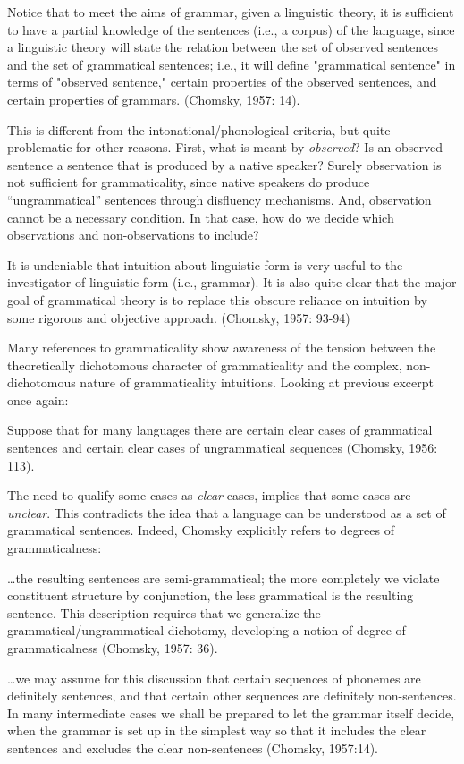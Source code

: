 Notice that to meet the aims of grammar, given a linguistic theory, it is sufficient to have a partial knowledge of the sentences (i.e., a corpus) of the language, since a linguistic theory will state the relation between the set of observed sentences and the set of grammatical sentences; i.e., it will define "grammatical sentence" in terms of "observed sentence," certain properties of the observed sentences, and certain properties of grammars. (Chomsky, 1957: 14).

  This is different from the intonational/phonological criteria, but quite problematic for other reasons. First, what is meant by \textit{observed}? Is an observed sentence a sentence that is produced by a native speaker? Surely observation is not sufficient for grammaticality, since native speakers do produce “ungrammatical” sentences through disfluency mechanisms. And, observation cannot be a necessary condition. In that case, how do we decide which observations and non-observations to include?

It is undeniable that intuition about linguistic form is very useful to the investigator of linguistic form (i.e., grammar). It is also quite clear that the major goal of grammatical theory is to replace this obscure reliance on intuition by some rigorous and objective approach. (Chomsky, 1957: 93-94)

  Many references to grammaticality show awareness of the tension between the theoretically dichotomous character of grammaticality and the complex, non-dichotomous nature of grammaticality intuitions. Looking at previous excerpt once again:

Suppose that for many languages there are certain clear cases of grammatical sentences and certain clear cases of ungrammatical sequences (Chomsky, 1956: 113).

The need to qualify some cases as \textit{clear} cases, implies that some cases are \textit{unclear}. This contradicts the idea that a language can be understood as a set of grammatical sentences. Indeed, Chomsky explicitly refers to degrees of grammaticalness: 

…the resulting sentences are semi-grammatical; the more completely we violate constituent structure by conjunction, the less grammatical is the resulting sentence. This description requires that we generalize the grammatical/ungrammatical dichotomy, developing a notion of degree of grammaticalness (Chomsky, 1957: 36).

…we may assume for this discussion that certain sequences of phonemes are definitely sentences, and that certain other sequences are definitely non-sentences. In many intermediate cases we shall be prepared to let the grammar itself decide, when the grammar is set up in the simplest way so that it includes the clear sentences and excludes the clear non-sentences (Chomsky, 1957:14).

